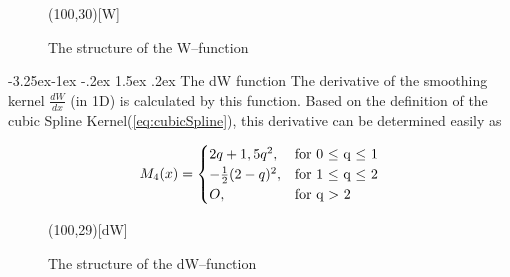 \documentclass{report}
\makeatletter
\renewcommand\paragraph{\@startsection{paragraph}{4}{\z@}%
  {-3.25ex\@plus -1ex \@minus -.2ex}%
  {1.5ex \@plus .2ex}%
  {\normalfont\normalsize\bfseries}}
\makeatother
\begin{document}
\begin{figure}[H]
\label{fig:W_structure}  

\begin{center}
\begin{struktogramm}(100,30)[W]
    \caseend
\end{struktogramm}
\end{center}

\caption{The structure of the W--function}
\end{figure}

\paragraph{The dW function}
The derivative of the smoothing kernel $\frac{dW}{dx}$ (in 1D) is calculated by this function. Based on the definition of the cubic Spline Kernel(\ref{eq:cubicSpline}), this derivative can be determined easily as

\begin{equation}
\label{eq:cubicSplineDer}
M_{4}(x)=\begin{cases}
\-2q+1,5q^2,& \text{for 0 $\leq$ q $\leq$ 1} \\
-\frac{1}{2}(2-q)^{2},&  \text{for 1 $\leq$ q $\leq$ 2} \\
O,& \text{for q $>$ 2}
\end{cases}
\end{equation}


\begin{figure}[H]
\label{fig:dW_structure}  

\begin{center}
\sProofOn
\begin{struktogramm}(100,29)[dW]
    \caseend

\end{struktogramm}
\sProofOff
\end{center}

\caption{The structure of the dW--function}
\end{figure}
\end{document}
